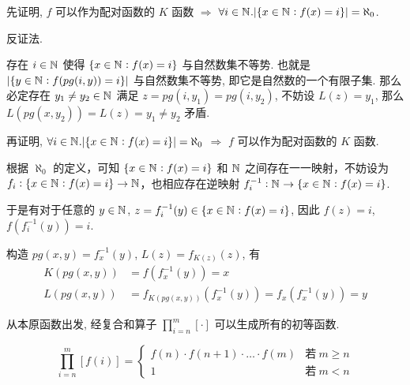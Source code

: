 \begin{solution}
先证明, $f$ 可以作为配对函数的 $K$ 函数 $\Longrightarrow$ $\forall i \in \mathbb{N}^{}. |\{ x \in \mathbb{N}^{} : f(x) = i \}| = \aleph_0$.

反证法.

存在 $i \in \mathbb{N}^{}$ 使得 $\{ x \in \mathbb{N}^{} : f(x) = i \}$ 与自然数集不等势. 也就是 $|\{ y \in \mathbb{N}^{} : f(pg(i, y)) = i \}|$ 与自然数集不等势, 即它是自然数的一个有限子集. 那么必定存在 $y_1 \neq y_2 \in \mathbb{N}^{}$ 满足 $z = pg(i, y_1) = pg(i, y_2)$, 不妨设 $L(z) = y_1$, 那么 $L(pg(x,y_2)) = L(z) = y_1 \neq y_2$ 矛盾.

再证明, $\forall i \in \mathbb{N}^{}. |\{ x \in \mathbb{N}^{} : f(x) = i \}| = \aleph_0$ $\Longrightarrow$ $f$ 可以作为配对函数的 $K$ 函数.

根据 $\aleph_0$ 的定义，可知 $\{ x \in \mathbb{N}^{} : f(x) = i \}$ 和 $\mathbb{N}^{}$ 之间存在一一映射，不妨设为 $f_i : \{ x \in \mathbb{N}^{} : f(x) = i \} \to \mathbb{N}^{}$，也相应存在逆映射 $f_i^{-1} : \mathbb{N}^{} \to \{ x \in \mathbb{N}^{} : f(x) = i \}$.

于是有对于任意的 $y \in \mathbb{N}^{}$, $z = f_i^{-1}(y) \in \{ x \in \mathbb{N}^{} : f(x) = i \}$, 因此 $f(z) = i$, $f(f_i^{-1}(y)) = i$.

构造 $pg(x, y) = f_x^{-1}(y)$, $L(z) = f_{K(z)}(z)$, 有
\begin{align*}
K(pg(x, y)) & = f(f_x^{-1}(y)) = x \\
L(pg(x, y)) & = f_{K(pg(x, y))}(f_x^{-1}(y)) = f_{x}(f_x^{-1}(y)) = y
\end{align*}
\end{solution}

\newpage

\begin{problem}
从本原函数出发, 经复合和算子 $\prod_{i=n}^m [\cdot]$ 可以生成所有的初等函数.

\[
\prod_{i=n}^m [f(i)] = \begin{cases}
f(n) \cdot f(n + 1) \cdot \dots \cdot f(m) & \text{若} ~ m \ge n \\
1 & \text{若} ~ m < n
\end{cases}
\]
\end{problem}


